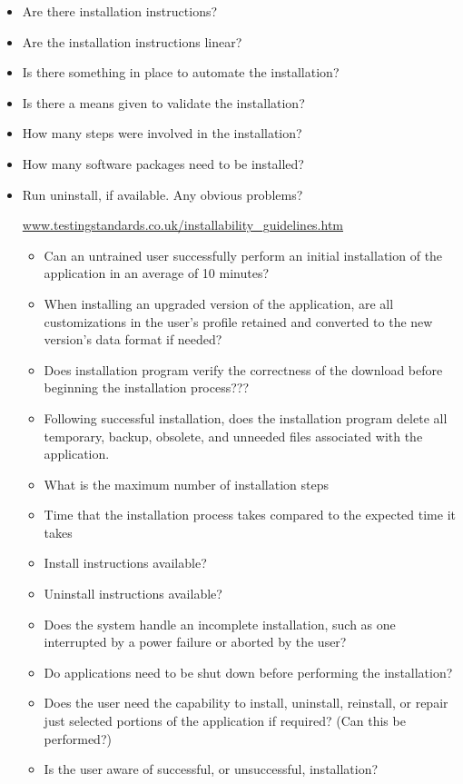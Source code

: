 \documentclass{article}
\begin{document}
\begin{itemize} 

	\item Are there installation instructions?
	\item Are the installation instructions linear?
	\item Is there something in place to automate the installation?
	\item Is there a means given to validate the installation?
	\item How many steps were involved in the installation?
	\item How many software packages need to be installed?
	\item Run uninstall, if available. Any obvious problems?


\subsubitem
 \url{www.testingstandards.co.uk/installability_guidelines.htm}
\begin{itemize}
	\item Can an untrained user successfully perform an initial installation of the application in an average of 10 minutes?
	\item When installing an upgraded version of the application, are all customizations in the user’s profile retained and converted to the new version’s data format if needed?
	\item Does installation program verify the correctness of the download before beginning the installation process???
	\item Following successful installation, does the installation program delete all temporary, backup, obsolete, and unneeded files associated with the application.
	\item What is the maximum number of installation steps
	\item Time that the installation process takes compared to the expected time it takes
	\item Install instructions available?
	\item Uninstall instructions available?
	\item Does the system handle an incomplete installation, such as one interrupted by a power failure or aborted by the user?
	\item Do applications need to be shut down before performing the installation?
	\item Does the user need the capability to install, uninstall, reinstall, or repair just selected portions of the application if required? (Can this be performed?)
	\item Is the user aware of successful, or unsuccessful, installation?
\end{itemize}

\end{itemize}
\end{document}
